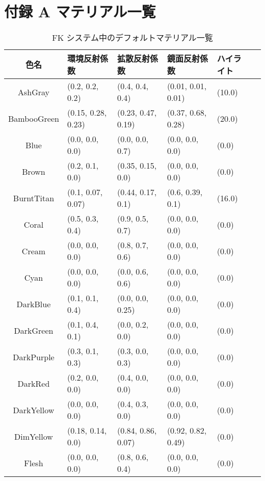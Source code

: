 \chapter*{付録 A マテリアル一覧}
\setcounter{chapter}{1}
\setcounter{table}{0}

\begin{table}[H]
\caption{FK システム中のデフォルトマテリアル一覧}
\label{tbl:MatTable}
\begin{footnotesize}
\begin{center}
\begin{tabular}{|c||l|l|l|l|l|}
\hline
色名 & 環境反射係数 & 拡散反射係数 &
		鏡面反射係数 & ハイライト \\ \hline \hline
AshGray & (0.2, 0.2, 0.2) & (0.4, 0.4, 0.4) & (0.01, 0.01, 0.01) & (10.0) \\ \hline
BambooGreen & (0.15, 0.28, 0.23) & (0.23, 0.47, 0.19) & (0.37, 0.68, 0.28) & (20.0) \\ \hline
Blue & (0.0, 0.0, 0.0) & (0.0, 0.0, 0.7) & (0.0, 0.0, 0.0) & (0.0) \\ \hline
Brown & (0.2, 0.1, 0.0) & (0.35, 0.15, 0.0) & (0.0, 0.0, 0.0) & (0.0) \\ \hline
BurntTitan & (0.1, 0.07, 0.07) & (0.44, 0.17, 0.1) & (0.6, 0.39, 0.1) & (16.0) \\ \hline
Coral & (0.5, 0.3, 0.4) & (0.9, 0.5, 0.7) & (0.0, 0.0, 0.0) & (0.0) \\ \hline
Cream & (0.0, 0.0, 0.0) & (0.8, 0.7, 0.6) & (0.0, 0.0, 0.0) & (0.0) \\ \hline
Cyan & (0.0, 0.0, 0.0) & (0.0, 0.6, 0.6) & (0.0, 0.0, 0.0) & (0.0) \\ \hline
DarkBlue & (0.1, 0.1, 0.4) & (0.0, 0.0, 0.25) & (0.0, 0.0, 0.0) & (0.0) \\ \hline
DarkGreen & (0.1, 0.4, 0.1) & (0.0, 0.2, 0.0) & (0.0, 0.0, 0.0) & (0.0) \\ \hline
DarkPurple & (0.3, 0.1, 0.3) & (0.3, 0.0, 0.3) & (0.0, 0.0, 0.0) & (0.0) \\ \hline
DarkRed & (0.2, 0.0, 0.0) & (0.4, 0.0, 0.0) & (0.0, 0.0, 0.0) & (0.0) \\ \hline
DarkYellow & (0.0, 0.0, 0.0) & (0.4, 0.3, 0.0) & (0.0, 0.0, 0.0) & (0.0) \\ \hline
DimYellow & (0.18, 0.14, 0.0) & (0.84, 0.86, 0.07) & (0.92, 0.82, 0.49) & (0.0) \\ \hline
Flesh & (0.0, 0.0, 0.0) & (0.8, 0.6, 0.4) & (0.0, 0.0, 0.0) & (0.0) \\ \hline

\end{tabular}
\end{center}
\end{footnotesize}
\end{table}
